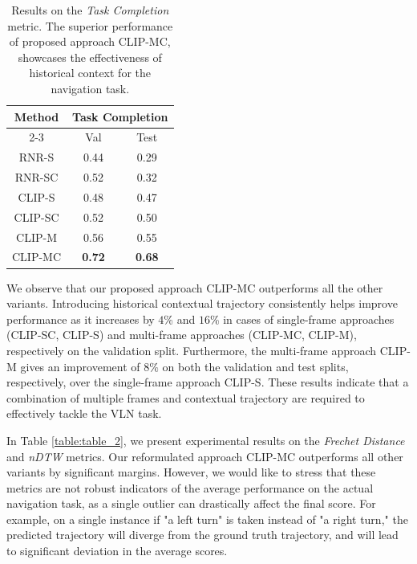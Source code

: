 \documentclass[letterpaper, 10 pt, conference]{ieeeconf}  %
\begin{document}
\begin{table}[htp]
\begin{center}
\small
\begin{tabular}{|c|cc|}
\hline
\multirow{2}{*}{Method} & \multicolumn{2}{c|}{Task Completion}               \\ \cline{2-3} 
                        & \multicolumn{1}{c|}{Val}           & Test          \\ \hline
RNR-S                   & \multicolumn{1}{c|}{0.44}          & 0.29          \\ \hline
RNR-SC                  & \multicolumn{1}{c|}{0.52}          & 0.32          \\ \hline
CLIP-S                  & \multicolumn{1}{c|}{0.48}          & 0.47          \\ \hline
CLIP-SC                 & \multicolumn{1}{c|}{0.52}          & 0.50          \\ \hline
CLIP-M                  & \multicolumn{1}{c|}{0.56}          & 0.55          \\ \hline
CLIP-MC                 & \multicolumn{1}{c|}{\textbf{0.72}} & \textbf{0.68} \\ \hline
\end{tabular}
\end{center}
\caption{Results on the \textit{Task Completion} metric. The superior performance of proposed approach CLIP-MC, showcases the effectiveness of historical context for the navigation task.}
\label{table:table_1}
\end{table}
\vspace{-1em}

We observe that our proposed approach CLIP-MC outperforms all the other variants. Introducing historical contextual trajectory consistently helps improve performance as it increases by $4$\% and $16$\% in cases of single-frame approaches (CLIP-SC, CLIP-S) and multi-frame approaches (CLIP-MC, CLIP-M), respectively on the validation split. Furthermore, the multi-frame approach CLIP-M gives an improvement of $8\%$ on both the validation and test splits, respectively, over the single-frame approach CLIP-S. These results indicate that a combination of multiple frames and contextual trajectory are required to effectively tackle the VLN task.

In Table \ref{table:table_2}, we present experimental results on the \textit{Frechet Distance} and \textit{nDTW} metrics. Our reformulated approach CLIP-MC outperforms all other variants by significant margins. However, we would like to stress that these metrics are not robust indicators of the average performance on the actual navigation task, as a single outlier can drastically affect the final score. For example, on a single instance if "a left turn" is taken instead of "a right turn," the predicted trajectory will diverge from the ground truth trajectory, and will lead to significant deviation in the average scores.
\end{document}
